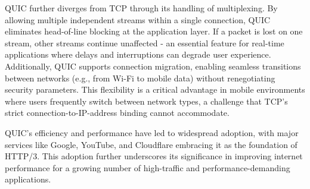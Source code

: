 QUIC further diverges from TCP through its handling of multiplexing. By allowing multiple independent streams within a single connection, QUIC eliminates head-of-line blocking at the application layer. If a packet is lost on one stream, other streams continue unaffected - an essential feature for real-time applications where delays and interruptions can degrade user experience. Additionally, QUIC supports connection migration, enabling seamless transitions between networks (e.g., from Wi-Fi to mobile data) without renegotiating security parameters. This flexibility is a critical advantage in mobile environments where users frequently switch between network types, a challenge that TCP's strict connection-to-IP-address binding cannot accommodate.

QUIC's efficiency and performance have led to widespread adoption, with major services like Google, YouTube, and Cloudflare embracing it as the foundation of HTTP/3. This adoption further underscores its significance in improving internet performance for a growing number of high-traffic and performance-demanding applications.